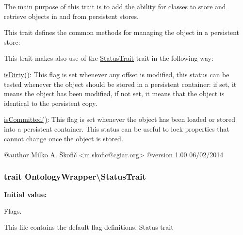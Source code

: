The main purpose of this trait is to add the ability for classes to store and retrieve objects in and from persistent stores.

This trait defines the common methods for managing the object in a persistent store\-:


\begin{DoxyItemize}
\item 
\end{DoxyItemize}

This trait makes also use of the \hyperlink{}{Status\-Trait} trait in the following way\-:


\begin{DoxyItemize}
\item {\ttfamily \hyperlink{namespace_ontology_wrapper_ad6a1ce4470a565eb806bf842a2b38aaf}{is\-Dirty()}}\-: This flag is set whenever any offset is modified, this status can be tested whenever the object should be stored in a persistent container\-: if set, it means the object has been modified, if not set, it means that the object is identical to the persistent copy. 
\item {\ttfamily \hyperlink{namespace_ontology_wrapper_a76edb24c245971fe5fdb3163a6d947b0}{is\-Committed()}}\-: This flag is set whenever the object has been loaded or stored into a persistent container. This status can be useful to lock properties that cannot change once the object is stored. 
\end{DoxyItemize}\begin{DoxyVerb} @author            Milko A. Škofič <m.skofic@cgiar.org>
 @version   1.00 06/02/2014\end{DoxyVerb}
 \hypertarget{namespace_ontology_wrapper_a3f5950ec516e30934eda786dd2f93a5f}{
\subsubsection[{Status\-Trait}]{\setlength{\rightskip}{0pt plus 5cm}trait Ontology\-Wrapper\textbackslash{}\-Status\-Trait}}\label{namespace_ontology_wrapper_a3f5950ec516e30934eda786dd2f93a5f}
{\bfseries Initial value\-:}
Flags.

This file contains the default flag definitions. Status trait

